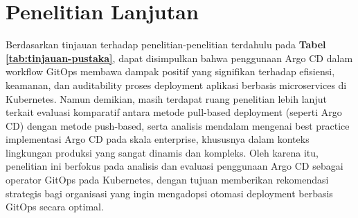 \section{Penelitian Lanjutan}
Berdasarkan tinjauan terhadap penelitian-penelitian terdahulu pada
\textbf{Tabel \ref{tab:tinjauan-pustaka}}, dapat disimpulkan bahwa penggunaan
Argo CD dalam workflow GitOps membawa dampak positif yang signifikan terhadap
efisiensi, keamanan, dan auditability proses deployment aplikasi berbasis
microservices di Kubernetes. Namun demikian, masih terdapat ruang penelitian
lebih lanjut terkait evaluasi komparatif antara metode pull-based deployment
(seperti Argo CD) dengan metode push-based, serta analisis mendalam mengenai
best practice implementasi Argo CD pada skala enterprise, khususnya dalam
konteks lingkungan produksi yang sangat dinamis dan kompleks. Oleh karena itu,
penelitian ini berfokus pada analisis dan evaluasi penggunaan Argo CD sebagai
operator GitOps pada Kubernetes, dengan tujuan memberikan rekomendasi strategis
bagi organisasi yang ingin mengadopsi otomasi deployment berbasis GitOps secara
optimal.

\newpage
